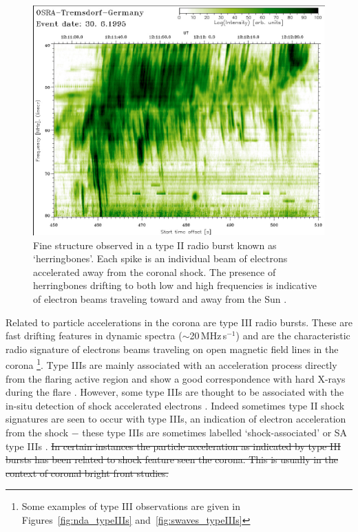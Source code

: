 \begin{figure}[!t]
\begin{center}
\includegraphics[scale=1.4]{images/miteva_herbones.pdf}
\caption[Herringbone radio bursts]{Fine structure observed in a type II radio burst known as `herringbones'. Each spike is an individual beam of electrons accelerated away from the coronal shock. The presence of herringbones drifting to both low and high frequencies is indicative of electron beams traveling toward and away from the Sun \citep{miteva2007}.}
\label{fig:hb_mann}
\end{center}
\end{figure}

Related to particle accelerations in the corona are type III radio bursts. These are fast drifting features in dynamic spectra ($\sim$20\,MHz\,s$^{-1}$) and are the characteristic radio signature of electrons beams traveling on open magnetic field lines in the corona \citep{pick2008}\footnote{Some examples of type III observations are given in Figures~\ref{fig:nda_typeIIIs} and~\ref{fig:swaves_typeIIIs}}. Type IIIs are mainly associated with an acceleration process directly from the flaring active region and show a good correspondence with hard X-rays during the flare \citep{vilmer2002}. However, some type IIIs are thought to be associated with the in-situ detection of shock accelerated electrons \citep{klassen2002, krucker1999}. Indeed sometimes type II shock signatures are seen to occur with type IIIs, an indication of electron acceleration from the shock $-$ these type IIIs are sometimes labelled `shock-associated' or SA type IIIs \citep{bougeret1998}. \st{In certain instances the particle acceleration as indicated by type III bursts has been related to shock feature seen the corona. This is usually in the context of coronal bright front studies.}

